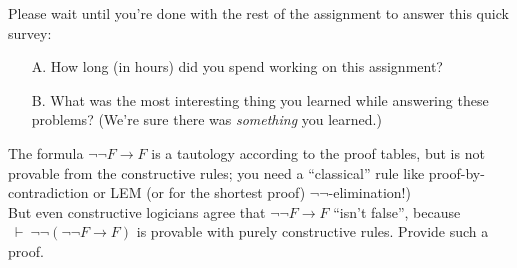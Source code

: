 \documentclass[12pt,letterpaper,boxed,cm]{hmcpset}
\newcommand{\ra}[0]{\rightarrow}
\newcommand{\cp}[0]{~\vdash~}
\begin{document}
\begin{solution}
    \vfill
\end{solution}
\newpage

\begin{problem} Please wait until you’re done with the rest of the assignment to answer this quick survey:
    \begin{enumerate}
        \item [A.] How long (in hours) did you spend working on this assignment?
        \item [B.] What was the most interesting thing you learned while answering these problems? (We’re sure there was \emph{something} you learned.)
    \end{enumerate}
\end{problem}

\begin{solution}
    \vfill
\end{solution}
\newpage

\begin{problem} The formula $\neg\neg F \ra F$ is a tautology according to the proof tables, but is not provable from the constructive rules; you need a ``classical'' rule like proof-by-contradiction or LEM (or for the shortest proof) $\neg\neg$-elimination!)\\

    But even constructive logicians agree that $\neg\neg F \ra F$ ``isn’t false'', because\\$\cp \neg\neg(\neg\neg F \ra F)$ is provable with purely constructive rules. Provide such a proof.
\end{problem}

\begin{solution}
    \vfill
\end{solution}
\newpage
\end{document}
